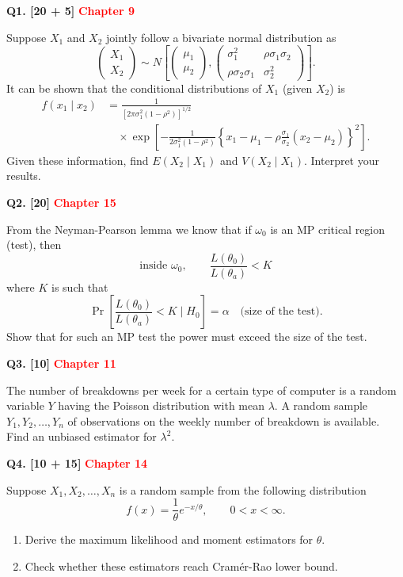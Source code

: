 \documentclass[11pt]{article}
\begin{document}
\medskip
\textbf{Q1. [20 + 5]}  \textbf{\textcolor{red}{Chapter 9}}

Suppose $X_1$ and $X_2$ jointly follow a bivariate normal distribution as
\[
\begin{pmatrix}X_1\\X_2\end{pmatrix}
\sim N\!\left[
\begin{pmatrix}\mu_1\\\mu_2\end{pmatrix},
\begin{pmatrix}
\sigma_1^2 & \rho\sigma_1\sigma_2\\
\rho\sigma_2\sigma_1 & \sigma_2^2
\end{pmatrix}
\right].
\]
It can be shown that the conditional distributions of $X_1$ (given $X_2$) is
\[
\begin{aligned}
f(x_1\mid x_2)
&=\frac{1}{[2\pi\sigma_1^2(1-\rho^2)]^{1/2}}\\[-1pt]
&\quad\times\exp\left[
-\frac{1}{2\sigma_1^2(1-\rho^2)}
\left\{x_1-\mu_1-\rho\frac{\sigma_1}{\sigma_2}(x_2-\mu_2)\right\}^{2}
\right].
\end{aligned}
\]
Given these information, find $E(X_2\mid X_1)$ and $V(X_2\mid X_1)$. Interpret your results.

\bigskip
\textbf{Q2. [20]}  \textbf{\textcolor{red}{Chapter 15}}

From the Neyman-Pearson lemma we know that if $\omega_0$ is an MP critical region (test), then
\[
\text{inside }\omega_0,\qquad \frac{L(\theta_0)}{L(\theta_a)}<K
\]
where $K$ is such that
\[
\Pr\left[\frac{L(\theta_0)}{L(\theta_a)}<K\mid H_0\right]
=\alpha\quad\text{(size of the test)}.
\]
Show that for such an MP test the power must exceed the size of the test.

\bigskip
\textbf{Q3. [10]}  \textbf{\textcolor{red}{Chapter 11}}

The number of breakdowns per week for a certain type of computer is a random variable $Y$ having the Poisson distribution with mean $\lambda$. A random sample $Y_1,Y_2,\ldots,Y_n$ of observations on the weekly number of breakdown is available. Find an unbiased estimator for $\lambda^2$.

\bigskip
\textbf{Q4. [10 + 15]}  \textbf{\textcolor{red}{Chapter 14}}

Suppose $X_1,X_2,\ldots,X_n$ is a random sample from the following distribution
\[
f(x)=\frac{1}{\theta}e^{-x/\theta},\qquad 0<x<\infty.
\]
\begin{enumerate}
\setlength{\itemsep}{5pt}\setlength{\parsep}{0pt}\setlength{\topsep}{3pt}
\item[(a)] Derive the maximum likelihood and moment estimators for $\theta$.
\item[(b)] Check whether these estimators reach Cram\'er-Rao lower bound.
\end{enumerate}
\end{document}
